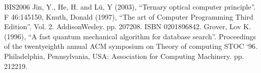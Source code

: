 \documentclass[a4paper,12pt,english]{sphinxhowto}
\begin{document}
\begin{sphinxthebibliography}{BIS\sphinxhyphen{}2006}
\sphinxAtStartPar
Jin, Y., He, H. and Lü, Y (2003), “Ternary optical computer principle”.  F 46:145\textendash{}150, 
\sphinxAtStartPar
Knuth, Donald (1997), “The art of Computer Programming Third Edition”. Vol. 2. Addison\sphinxhyphen{}Wesley. pp. 207\sphinxhyphen{}208. ISBN 0\sphinxhyphen{}201\sphinxhyphen{}89684\sphinxhyphen{}2.
\sphinxAtStartPar
Grover, Lov K. (1996), “A fast quantum mechanical algorithm for database search”. Proceedings of the twenty\sphinxhyphen{}eighth annual ACM symposium on Theory of computing \sphinxhyphen{} STOC ‘96. Philadelphia, Pennsylvania, USA: Association for Computing Machinery. pp. 212\textendash{}219.
\end{sphinxthebibliography}



\renewcommand{\indexname}{Index}
\printindex
\end{document}
